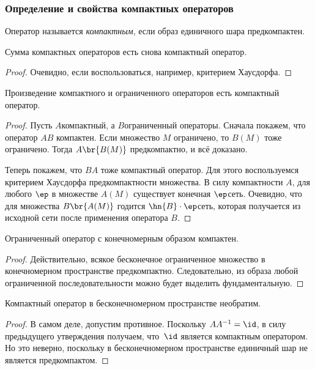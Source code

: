 \documentclass[a4paper]{article}
\begin{document}
\subsubsection{Определение и свойства компактных операторов}

\begin{df}
Оператор называется \emph{компактным}, если образ единичного шара предкомпактен.
\end{df}

\begin{stm}
Сумма компактных операторов есть снова компактный оператор.
\end{stm}
\begin{proof}
Очевидно, если воспользоваться, например, критерием Хаусдорфа.
\end{proof}

\begin{stm}
Произведение компактного и ограниченного операторов есть компактный оператор.
\end{stm}
\begin{proof}
Пусть $A$\т компактный, а $B$\т ограниченный операторы. Сначала покажем,
что оператор $AB$ компактен. Если множество $M$ ограничено, то $B(M)$ тоже ограничено.
Тогда $A\br{B(M)}$ предкомпактно, и всё доказано.

Теперь покажем, что $BA$ тоже компактный оператор. Для этого воспользуемся критерием Хаусдорфа
предкомпактности множества. В силу компактности $A$, для любого $\ep$ в множестве
$A(M)$ существует конечная $\ep$\д сеть. Очевидно, что для множества $B\br{A(M)}$ годится
$\hn{B}\cdot \ep$\д сеть, которая получается из исходной сети после применения оператора $B$.
\end{proof}

\begin{stm}
Ограниченный оператор с конечномерным образом компактен.
\end{stm}
\begin{proof}
Действительно, всякое бесконечное ограниченное множество в конечномерном пространстве
предкомпактно. Следовательно, из образа любой ограниченной последовательности
можно будет выделить фундаментальную.
\end{proof}

\begin{imp}
Компактный оператор в бесконечномерном пространстве необратим.
\end{imp}
\begin{proof}
В самом деле, допустим противное. Поскольку $AA^{-1} = \id$, в силу предыдущего
утверждения получаем, что~$\id$ является компактным оператором. Но это неверно,
поскольку в бесконечномерном пространстве единичный шар не является предкомпактом.
\end{proof}
\end{document}

